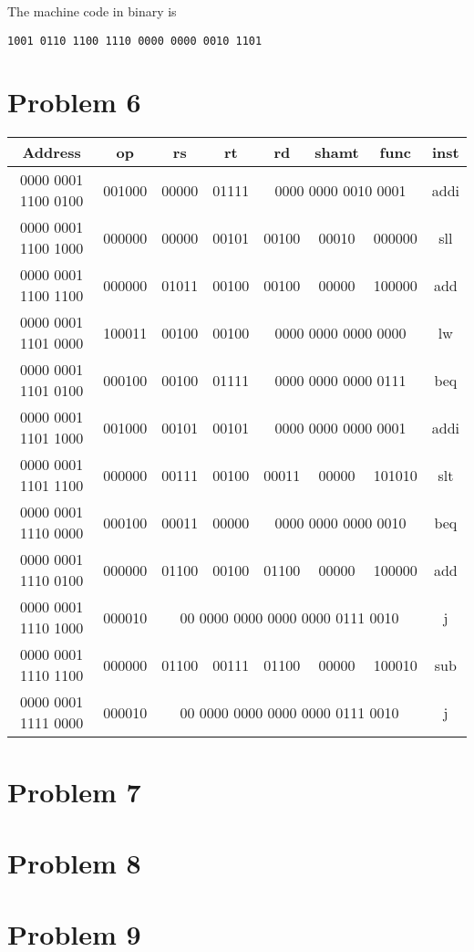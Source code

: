 \documentclass[12pt]{article}
\begin{document}
The machine code in binary is
\begin{verbatim}
1001 0110 1100 1110 0000 0000 0010 1101
\end{verbatim}

\section*{Problem 6}

\begin{center}
        \begin{tabular}{|c||c|c|c|c|c|c|c|}
                \hline
                Address & op & rs & rt & rd & shamt & func & inst \\
                \hline\hline
                0000 0001 1100 0100 & 001000 & 00000 & 01111 & \multicolumn{3}{|c|}{0000 0000 0010 0001} & addi\\
                \hline
                0000 0001 1100 1000 & 000000 & 00000 & 00101 & 00100 & 00010 & 000000 & sll\\
                \hline
                0000 0001 1100 1100 & 000000 & 01011 & 00100 & 00100 & 00000 & 100000& add\\
                \hline
                0000 0001 1101 0000 & 100011 & 00100 & 00100 & \multicolumn{3}{|c|}{0000 0000 0000 0000} & lw\\
                \hline
                0000 0001 1101 0100 & 000100 & 00100 & 01111 & \multicolumn{3}{|c|}{0000 0000 0000 0111} & beq\\
                \hline
                0000 0001 1101 1000 & 001000 & 00101 & 00101 & \multicolumn{3}{|c|}{0000 0000 0000 0001} & addi\\
                \hline
                0000 0001 1101 1100 & 000000 & 00111 & 00100 & 00011 & 00000 & 101010 & slt\\
                \hline
                0000 0001 1110 0000 & 000100 & 00011 & 00000 & \multicolumn{3}{|c|}{0000 0000 0000 0010} & beq\\
                \hline
                0000 0001 1110 0100 & 000000 & 01100 & 00100 & 01100 & 00000 & 100000 & add\\
                \hline
                0000 0001 1110 1000 & 000010 & \multicolumn{5}{|c|}{00 0000 0000 0000 0000 0111 0010} & j\\
                \hline
                0000 0001 1110 1100 & 000000 & 01100 & 00111 & 01100 & 00000 & 100010 & sub\\
                \hline
                0000 0001 1111 0000 & 000010 & \multicolumn{5}{|c|}{00 0000 0000 0000 0000 0111 0010} & j\\
                \hline
        \end{tabular}
\end{center}

\section*{Problem 7}



\section*{Problem 8}
\section*{Problem 9}
\end{document}
